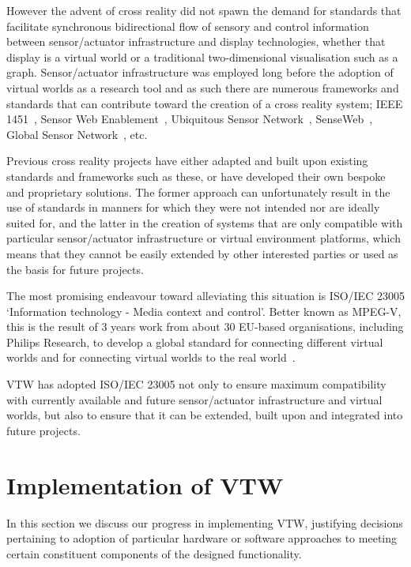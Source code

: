 \documentclass[conference,a4paper]{IEEEtran}
\begin{document}
However the advent of cross reality did not spawn the demand for standards that facilitate synchronous bidirectional flow of sensory and control information between sensor/actuator infrastructure and display technologies, whether that display is a virtual world or a traditional two-dimensional visualisation such as a graph. Sensor/actuator infrastructure was employed long before the adoption of virtual worlds as a research tool and as such there are numerous frameworks and standards that can contribute toward the creation of a cross reality system; IEEE 1451~\cite{Song2008}, Sensor Web Enablement~\cite{Botts2008}, Ubiquitous Sensor Network~\cite{kim:practical}, SenseWeb~\cite{Kansal2007}, Global Sensor Network~\cite{Aberer2006}, etc.

Previous cross reality projects have either adapted and built upon existing standards and frameworks such as these, or have developed their own bespoke and proprietary solutions. The former approach can unfortunately result in the use of standards in manners for which they were not intended nor are ideally suited for, and the latter in the creation of systems that are only compatible with particular sensor/actuator infrastructure or virtual environment platforms, which means that they cannot be easily extended by other interested parties or used as the basis for future projects.

The most promising endeavour toward alleviating this situation is ISO/IEC 23005 `Information technology - Media context and control'. Better known as MPEG-V, this is the result of 3 years work from about 30 EU-based organisations, including Philips Research, to develop a global standard for connecting different virtual worlds and for connecting virtual worlds to the real world~\cite{Gelissen2011a}.

VTW has adopted ISO/IEC 23005 not only to ensure maximum compatibility with currently available and future sensor/actuator infrastructure and virtual worlds, but also to ensure that it can be extended, built upon and integrated into future projects.

\section{Implementation of VTW}
\label{sec:implementationofvtw}
In this section we discuss our progress in implementing VTW, justifying decisions pertaining to adoption of particular hardware or software approaches to meeting certain constituent components of the designed functionality.
\end{document}

